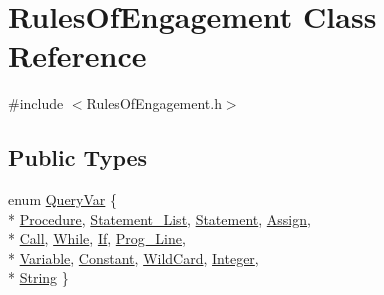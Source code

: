 \hypertarget{class_rules_of_engagement}{\section{Rules\-Of\-Engagement Class Reference}
\label{class_rules_of_engagement}
}


{\ttfamily \#include $<$Rules\-Of\-Engagement.\-h$>$}

\subsection*{Public Types}
\begin{DoxyCompactItemize}
\item 
enum \hyperlink{class_rules_of_engagement_a5dd2b28fd0c906d9b08e29e371713ead}{Query\-Var} \{ \\*
\hyperlink{class_rules_of_engagement_a5dd2b28fd0c906d9b08e29e371713eadaab34e372c1b64076502beba90e0afaf9}{Procedure}, 
\hyperlink{class_rules_of_engagement_a5dd2b28fd0c906d9b08e29e371713eadaf2f49b1a5bb530fff2bb591349d850cd}{Statement\-\_\-\-List}, 
\hyperlink{class_rules_of_engagement_a5dd2b28fd0c906d9b08e29e371713eadaa8e11c65c22baf0626ac3993cd82f37c}{Statement}, 
\hyperlink{class_rules_of_engagement_a5dd2b28fd0c906d9b08e29e371713eada15e00fc67ee38d30f53a32bf2d6990e1}{Assign}, 
\\*
\hyperlink{class_rules_of_engagement_a5dd2b28fd0c906d9b08e29e371713eada36c5ed1bbf1ea556a09749d743eb2b51}{Call}, 
\hyperlink{class_rules_of_engagement_a5dd2b28fd0c906d9b08e29e371713eadaea50c71b856bf8fa6b50ebd5bd1602b6}{While}, 
\hyperlink{class_rules_of_engagement_a5dd2b28fd0c906d9b08e29e371713eadae83e4c31ffaacea1cb82bb0c92ebec1f}{If}, 
\hyperlink{class_rules_of_engagement_a5dd2b28fd0c906d9b08e29e371713eada2cbcab2ebd1a31dfd75cf5f8ec2f9a83}{Prog\-\_\-\-Line}, 
\\*
\hyperlink{class_rules_of_engagement_a5dd2b28fd0c906d9b08e29e371713eada22bb3bc5b545fb86bd4db389985f26a0}{Variable}, 
\hyperlink{class_rules_of_engagement_a5dd2b28fd0c906d9b08e29e371713eada50808eddb9dd64f550ed8a5d303c415e}{Constant}, 
\hyperlink{class_rules_of_engagement_a5dd2b28fd0c906d9b08e29e371713eada9e5c7c59bdbe22a0aa66d26d6d241bbb}{Wild\-Card}, 
\hyperlink{class_rules_of_engagement_a5dd2b28fd0c906d9b08e29e371713eadaa5f0e7dd40345ec4288b8faa4fb02216}{Integer}, 
\\*
\hyperlink{class_rules_of_engagement_a5dd2b28fd0c906d9b08e29e371713eada6861f185780af85c0d245304aa6ff3e9}{String}
 \}
\item 

\end{DoxyCompactItemize}
